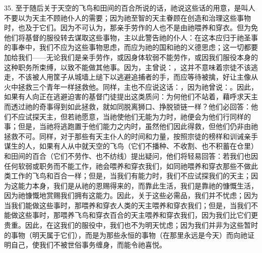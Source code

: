 35. 至于随后关于天空的飞鸟和田间的百合所说的话，祂说这些话的用意，是叫人不要以为天主不顾祂仆人的需要；因为祂至智的天主眷顾在创造和治理这些事物时，也及于它们。因为不可认为，那亲手劳作的人也不是由祂喂养和穿衣。但为免他们将基督的服役转去谋取这些事物，主以此警告祂的仆人：在这本应归于祂圣事的事奉中，我们不应为这些事物思虑，而应为祂的国和祂的义德思虑；这一切都要加给我们——无论我们是亲手劳作，或因身体软弱不能劳作，或因我们服役本身的这种职务所束缚，以致不能做其他事。因为，主曾说：，这并不意味着宗徒不该逃走，不该被人用筐子从城墙上缒下以逃避追捕者的手，而应等待被擒，好让主像从火中拯救三个青年一样拯救他。同样，主也不应说这话：，因为祂曾说：。因此，如果有人向正在逃避迫害的基督门徒提出这类质问：为何他们不站着，藉呼求天主而透过祂的奇事得到如此拯救，就如同脱离狮口、挣脱锁链一样？他们必回答：他们不应试探天主，但若祂愿意，当祂使他们无能为力时，祂便会为他们行同样的事；但是，当祂将逃跑置于他们能力之内时，虽然他们因此得救，但他们仍非由祂拯救不可。同样，对于那些有天主仆人的时间和力量，按照宗徒的榜样和训诫亲手谋生的人，如果有人从中就天空的飞鸟（它们不播种、不收割、也不积蓄在仓里）和田间的百合（它们不劳作、也不纺线）提出疑问，他们将轻易回答：若我们也因任何软弱或职务而不能工作，祂会喂养和穿衣我们，如同祂喂养和穿衣那些不做此类工作的飞鸟和百合一样；但是，当我们有能力时，我们不应试探我们的天主；因为这能力本身，我们是从祂的恩赐得来的，而靠此生活，我们是靠祂的慷慨生活，因为祂慷慨地赏赐我们拥有这能力。因此，关于这些必需品，我们并不忧虑；因为当我们能做这些事时，那喂养和穿衣人类的天主喂养和穿衣我们；但是，当我们不能做这些事时，那喂养飞鸟和穿衣百合的天主喂养和穿衣我们，因为我们比它们更贵重。因此，在这我们的服役中，我们也不为明天忧虑；因为我们并非为这些暂时的事物（明天属于它们），而是为那些永恒的事物（在那里永远是今天）而向祂证明自己，使我们不被世俗事务缠身，而能令祂喜悦。\par

